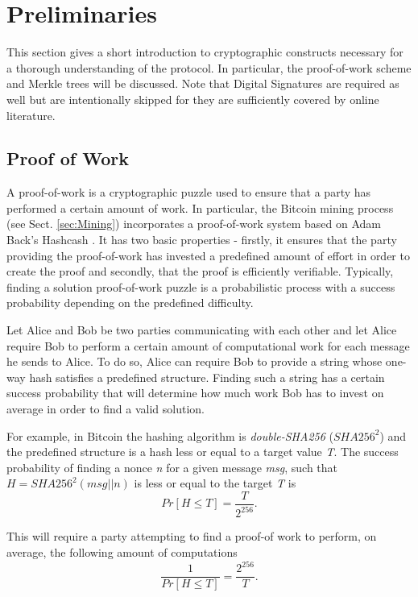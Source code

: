 \section{Preliminaries} \label{sec:Preliminaries}
This section gives a short introduction to cryptographic constructs necessary for a thorough understanding of the protocol. In particular, the proof-of-work scheme and Merkle trees will be discussed. Note that Digital Signatures are required as well but are intentionally skipped for they are sufficiently covered by online literature.

\subsection{Proof of Work} \label{sec:ProofOfWork}
A proof-of-work is a cryptographic puzzle used to ensure that a party has performed a certain amount of work. In particular, the Bitcoin mining process (see Sect. \ref{sec:Mining}) incorporates a proof-of-work system based on Adam Back's Hashcash \cite{Back_Hashcash}. It has two basic properties - firstly, it ensures that the party providing the proof-of-work has invested a predefined amount of effort in order to create the proof and secondly, that the proof is efficiently verifiable. Typically, finding a solution proof-of-work puzzle is a probabilistic process with a success probability depending on the predefined difficulty.

Let Alice and Bob be two parties communicating with each other and let Alice require Bob to perform a certain amount of computational work for each message he sends to Alice. To do so, Alice can require Bob to provide a string whose one-way hash satisfies a predefined structure. Finding such a string has a certain success probability that will determine how much work Bob has to invest on average in order to find a valid solution.

For example, in Bitcoin the hashing algorithm is \emph{double-SHA256} ($\mathit{SHA256^{2}}$) and the predefined structure is a hash less or equal to a target value \emph{T}. The success probability of finding a nonce \emph{n} for a given message \emph{msg}, such that $\mathit{H = SHA256^{2}(msg||n)}$ is less or equal to the target \emph{T} is
\begin{equation}
Pr[H \leq T] = \frac{T}{2^{256}}.
\end{equation}

\newpage
\noindent
This will require a party attempting to find a proof-of work to perform, on average, the following amount of computations
\begin{equation}
\frac{1}{Pr[H \leq T]} = \frac{2^{256}}{T}.
\end{equation}

